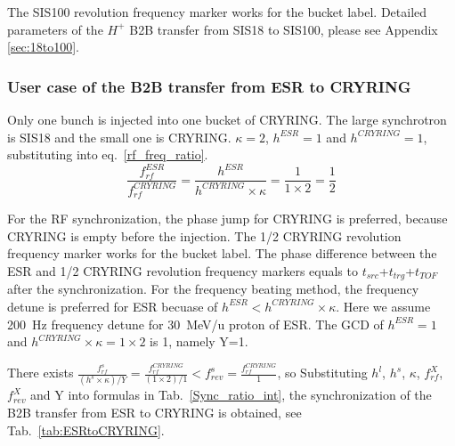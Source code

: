 The SIS100 revolution frequency marker works for the bucket label. Detailed parameters of the $H^{+}$ B2B transfer from SIS18 to SIS100, please see Appendix \ref{sec:18to100}.
\subsubsection{User case of the B2B transfer from ESR to CRYRING}
Only one bunch is injected into one bucket of CRYRING. The large synchrotron is SIS18 and the small one is CRYRING. $\kappa=2$, $h^{ESR}=1$ and $h^{CRYRING}=1$, substituting into eq.~\ref{rf_freq_ratio}. 
\begin{equation}
\frac{f_{rf}^{ESR}}{f_{rf}^{CRYRING}}= \frac {h^{ESR}}{h^{CRYRING} \times \kappa}= \frac{1}{1 \times 2}=\frac{1}{2}
\end{equation}

For the RF synchronization, the phase jump for CRYRING is preferred, because CRYRING is empty before the injection. The 1/2 CRYRING revolution frequency marker works for the bucket label. The phase difference between the ESR and 1/2 CRYRING revolution frequency markers equals to $t_{src}$+$t_{trg}$+$t_{TOF}$ after the synchronization. 
For the frequency beating method, the frequency detune is preferred for ESR becuase of $h^{ESR} < h^{CRYRING} \times \kappa$. Here we assume \SI{200}{Hz} frequency detune for \SI{30}{MeV/\atomicmassunit} proton of ESR. The GCD of $h^{ESR}=1$ and $h^{CRYRING} \times \kappa=1\times 2$ is 1, namely Y=1.

There exists $\frac{f_{rf}^{s}}{(h^s\times \kappa)/Y}=\frac{f_{rf}^{CRYRING}}{(1\times 2)/1}< f_{rev}^{s}=\frac{f_{rf}^{CRYRING}}{1}$, so Substituting $h^l$, $h^s$, $\kappa$, $f_{rf}^{X}$, $f_{rev}^{X}$ and Y into formulas in Tab.~\ref{Sync_ratio_int}, the synchronization of the B2B transfer from ESR to CRYRING is obtained, see Tab.~\ref{tab:ESRtoCRYRING}.

